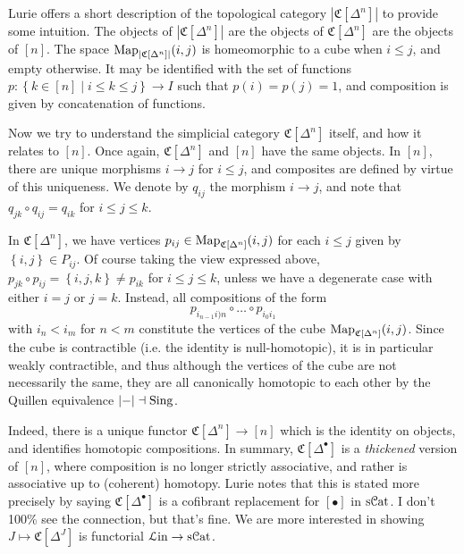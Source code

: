 Lurie offers a short description of the topological category $\left| \mathfrak{C} [\Delta^n] \right| $ to provide some intuition. The objects of $\left| \mathfrak{C} [\Delta^n] \right| $ are the objects of $\mathfrak{C} [\Delta^n]$ are the objects of $[n]$. The space $\operatorname{Map}_{\left| \mathfrak{C} [\Delta^n ]\right| } (i,j)$ is homeomorphic to a cube when $i\leq j$, and empty otherwise. It may be identified with the set of functions $p : \left\{ k\in[n]\mid i\leq k\leq j \right\}  \to I$ such that $p(i)=p(j)=1$, and composition is given by concatenation of functions.

Now we try to understand the simplicial category $\mathfrak{C} [\Delta^n]$ itself, and how it relates to $[n]$. Once again, $\mathfrak{C} [\Delta^n]$ and $[n]$ have the same objects. In $[n]$, there are unique morphisms $i\to j$ for $i\leq j$, and composites are defined by virtue of this uniqueness. We denote by $q_{ij} $ the morphism $i\to j$, and note that $q_{jk} \circ q_{ij} =q_{ik}$ for $i\leq j\leq k$.

In $\mathfrak{C} [\Delta^n]$, we have vertices $p_{ij} \in \operatorname{Map} _{\mathfrak{C} [\Delta^n]} (i,j)$ for each $i\leq j$ given by $\left\{ i,j \right\} \in P_{ij} $. Of course taking the view expressed above, $p_{jk} \circ p_{ij} =\left\{ i,j,k \right\} \neq p_{ik} $ for $i\leq j\leq k$, unless we have a degenerate case with either $i=j$ or $j=k$. Instead, all compositions of the form
\[
	p_{i_{n-1} i)n} \circ \ldots \circ p_{i_0i_1} 
\]
with $i_n < i_m$ for $n<m$ constitute the vertices of the cube $\operatorname{Map}_{\mathfrak{C}[\Delta ^n]}(i,j)$. Since the cube is contractible (i.e. the identity is null-homotopic), it is in particular weakly contractible, and thus although the vertices of the cube are not necessarily the same, they are all canonically homotopic to each other by the Quillen equivalence $\left| - \right| \dashv \operatorname{Sing}$.

Indeed, there is a unique functor $\mathfrak{C} [\Delta ^n]\to [n]$ which is the identity on objects, and identifies homotopic compositions. In summary, $\mathfrak{C} [\Delta ^{\bullet} ]$ is a \emph{thickened} version of $[n]$, where composition is no longer strictly associative, and rather is associative up to (coherent) homotopy. Lurie notes that this is stated more precisely by saying $\mathfrak{C} [\Delta ^{\bullet} ]$ is a cofibrant replacement for $[\bullet ]$ in $\mathrm{s} \mathcal{C}\mathrm{at} $. I don't 100\% see the connection, but that's fine. We are more interested in showing  $J\mapsto \mathfrak{C} [\Delta ^J]$ is functorial $\mathcal{L} \mathrm{in} \to \mathrm{s} \mathcal{C}\mathrm{at} $.

